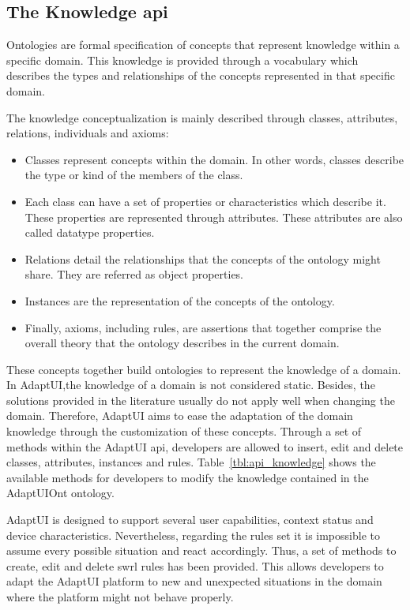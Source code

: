 \subsection{The Knowledge \ac{api}}
\label{sec:knowledge_api}

Ontologies are formal specification of concepts that represent knowledge within
a specific domain. This knowledge is provided through a vocabulary which describes
the types and relationships of the concepts represented in that specific domain.

The knowledge conceptualization is mainly described through classes, attributes,
relations, individuals and axioms: 

\begin{itemize}
  \item Classes represent concepts within the domain. In other words, classes
  describe the type or kind of the members of the class.
  
  \item Each class can have a set of properties or characteristics which describe
  it. These properties are represented through attributes. These attributes
  are also called datatype properties.
  
  \item Relations detail the relationships that the concepts of the ontology
  might share. They are referred as object properties.
  \item Instances are the representation of the concepts of the
  ontology.
  
  \item Finally, axioms, including rules, are assertions that together comprise
  the overall theory that the ontology describes in the current domain.
\end{itemize}

These concepts together build ontologies to represent the knowledge of a domain.
In AdaptUI,the knowledge of a domain is not considered static. Besides, the 
solutions provided in the literature usually do not apply well when changing 
the domain. Therefore, AdaptUI aims to ease the adaptation of the domain 
knowledge through the customization of these concepts. Through a set of methods 
within the AdaptUI \ac{api}, developers are allowed to insert, edit and delete 
classes, attributes, instances and rules. Table~\ref{tbl:api_knowledge} shows 
the available methods for developers to modify the knowledge contained in the 
AdaptUIOnt ontology.

AdaptUI is designed to support several user capabilities, context status and
device characteristics. Nevertheless, regarding the rules set it is impossible
to assume every possible situation and react accordingly. Thus, a set of methods
to create, edit and delete \ac{swrl} rules has been provided. This allows 
developers to adapt the AdaptUI platform to new and unexpected situations in the 
domain where the platform might not behave properly.

